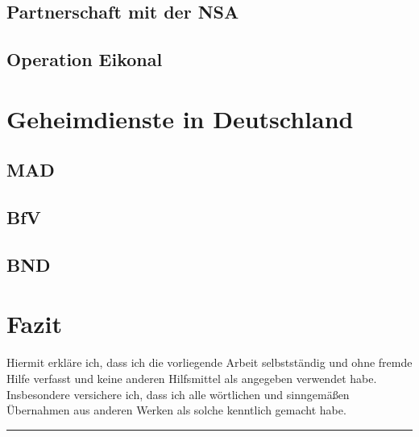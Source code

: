 \documentclass[12pt,a4paper]{scrartcl}
\begin{document}
\subsection{Partnerschaft mit der NSA}

\subsection{Operation Eikonal}

\section{Geheimdienste in Deutschland}

\subsection{MAD}

\subsection{BfV}

\subsection{BND}

\section{Fazit}

\newpage
\printbibliography
\newpage

Hiermit erkläre ich, dass ich die vorliegende Arbeit selbstständig und ohne fremde Hilfe verfasst und keine anderen Hilfsmittel als angegeben verwendet habe. Insbesondere versichere ich, dass ich alle wörtlichen und sinngemäßen Übernahmen aus anderen Werken als solche kenntlich gemacht habe.
\vspace{2cm}
\hrule
\end{document}
